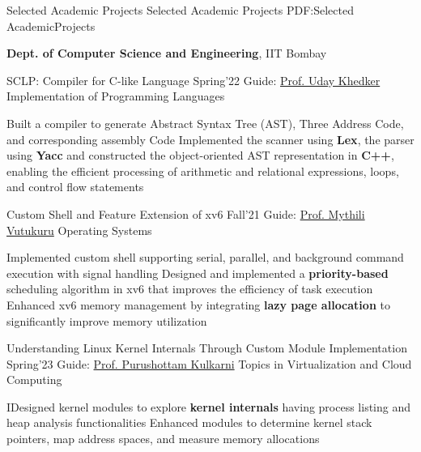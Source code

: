 
\Section
{Selected Academic Projects}
{Selected Academic Projects}
{PDF:Selected AcademicProjects}

\Entry
\textbf{Dept. of Computer Science and Engineering}, IIT Bombay

\Gap
\BulletItem
SCLP: Compiler for C-like Language \hfill Spring'22 \newline
{\small Guide: \href{https://www.cse.iitb.ac.in/~uday/teaching.html}{Prof. Uday Khedker}} \hfill {\footnotesize Implementation of Programming Languages}
\begin{Detail}
    \SubBulletItem Built a compiler to generate Abstract Syntax Tree (AST), Three Address Code, and corresponding assembly Code
    \SubBulletItem Implemented the scanner using {\bf Lex}, the parser using {\bf Yacc} and constructed the object-oriented AST representation in {\bf C++}, enabling the efficient processing of arithmetic and relational expressions, loops, and control flow statements
\end{Detail}

\Gap
\BulletItem
Custom Shell and Feature Extension of xv6 \href{https://github.com/rajagond/OS-TAship-Autumn-2022}{\faGithub} \hfill Fall'21 \newline
{\small Guide: \href{https://www.cse.iitb.ac.in/~mythili/}{Prof. Mythili Vutukuru}} \hfill {\footnotesize Operating Systems}
\begin{Detail}
    \SubBulletItem Implemented custom shell supporting serial, parallel, and background command execution with signal handling 
    \SubBulletItem Designed and implemented a {\bf priority-based} scheduling algorithm in xv6 that improves the efficiency of task execution
    \SubBulletItem Enhanced xv6 memory management by integrating {\bf lazy page allocation} to significantly improve memory utilization
\end{Detail}

\Gap
\BulletItem
Understanding Linux Kernel Internals Through Custom Module Implementation \href{https://github.com/rajagond/CS695-2023}{\faGithub} \hfill Spring'23 \newline
{\small Guide: \href{https://www.cse.iitb.ac.in/~puru}{Prof. Purushottam Kulkarni}} \hfill {\footnotesize Topics in Virtualization and Cloud Computing}
\begin{Detail}
    \SubBulletItem IDesigned kernel modules to explore \textbf{kernel internals} having process listing and heap analysis functionalities
    \SubBulletItem Enhanced modules to determine kernel stack pointers, map address spaces, and measure memory allocations
\end{Detail}

